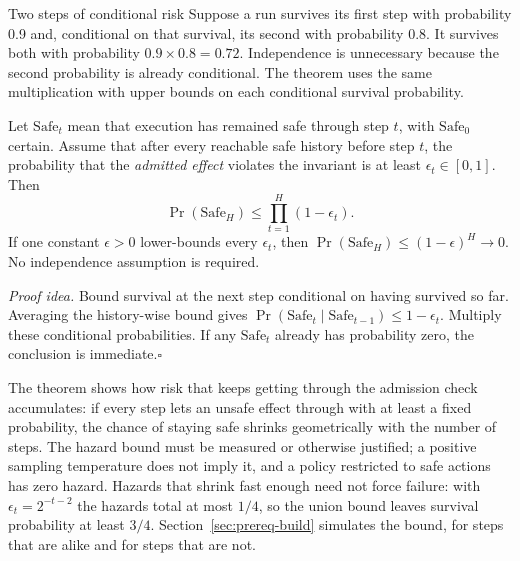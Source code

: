 \begin{pdexample}{Two steps of conditional risk}
Suppose a run survives its first step with probability 0.9 and, conditional on
that survival, its second with probability 0.8. It survives both with probability
$0.9\times0.8=0.72$. Independence is unnecessary because the second probability
is already conditional. The theorem uses the same multiplication with upper
bounds on each conditional survival probability.
\end{pdexample}

\begin{theorem}\label{thm:non-determinism}
Let $\mathrm{Safe}_t$ mean that execution has remained safe through step $t$, with $\mathrm{Safe}_0$ certain. Assume that after every reachable safe history before step $t$, the probability that the \emph{admitted effect} violates the invariant is at least $\epsilon_t\in[0,1]$. Then
\begin{equation}
\Pr(\mathrm{Safe}_H)\le\prod_{t=1}^{H}(1-\epsilon_t).
\end{equation}
If one constant $\epsilon>0$ lower-bounds every $\epsilon_t$, then $\Pr(\mathrm{Safe}_H)\le(1-\epsilon)^H\to0$. No independence assumption is required.
\end{theorem}
\noindent\textit{Proof idea.} Bound survival at the next step conditional on having survived so far. Averaging the history-wise bound gives $\Pr(\mathrm{Safe}_t\mid \mathrm{Safe}_{t-1})\le1-\epsilon_t$. Multiply these conditional probabilities. If any $\mathrm{Safe}_t$ already has probability zero, the conclusion is immediate.\hfill$\square$

The theorem shows how risk that keeps getting through the admission check accumulates: if every step lets an unsafe effect through with at least a fixed probability, the chance of staying safe shrinks geometrically with the number of steps. The hazard bound must be measured or otherwise justified; a positive sampling temperature does not imply it, and a policy restricted to safe actions has zero hazard. Hazards that shrink fast enough need not force failure: with $\epsilon_t=2^{-t-2}$ the hazards total at most $1/4$, so the union bound leaves survival probability at least $3/4$.
Section~\ref{sec:prereq-build} simulates the bound, for steps that are alike and for steps that are not.

